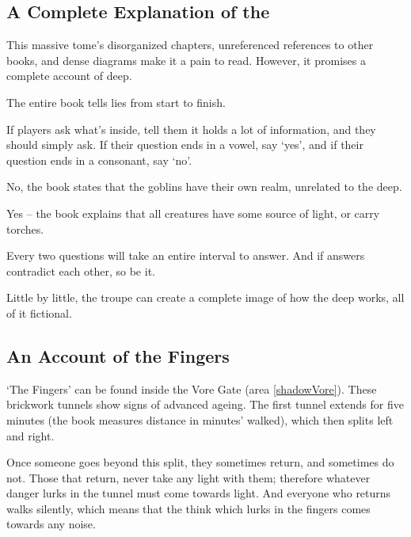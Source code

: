 \begin{multicols}{2}

\subsection{A Complete Explanation of the }
\label{bookOfDeep}

This massive tome's disorganized chapters, unreferenced references to other books, and dense diagrams make it a pain to read.
However, it promises a complete account of \gls{deep}.

The entire book tells lies from start to finish.

If players ask what's inside, tell them it holds a lot of information, and they should simply ask.
If their question ends in a vowel, say `yes', and if their question ends in a consonant, say `no'.

\begin{description}
  \itshape
  \item[Do goblins live in the \gls{deep}?]
  No, the book states that the goblins have their own realm, unrelated to the \gls{deep}.
  \item[Do the creatures down there just carry lights all the time?]
  Yes -- the book explains that all creatures have some source of light, or carry torches.
\end{description}

Every two questions will take an entire \gls{interval} to answer.
And if answers contradict each other, so be it.

Little by little, the troupe can create a complete image of how the \gls{deep} works, all of it fictional.

\subsection{An Account of the Fingers}
\label{bookOfFingers}

`The Fingers' can be found inside the Vore Gate (area \vref{shadowVore}).
These brickwork tunnels show signs of advanced ageing.
The first tunnel extends for five minutes (the book measures distance in minutes' walked), which then splits left and right.

Once someone goes beyond this split, they sometimes return, and sometimes do not.
Those that return, never take any light with them; therefore whatever danger lurks in the tunnel must come towards light.
And everyone who returns walks silently, which means that the think which lurks in the fingers comes towards any noise.


\end{multicols}
